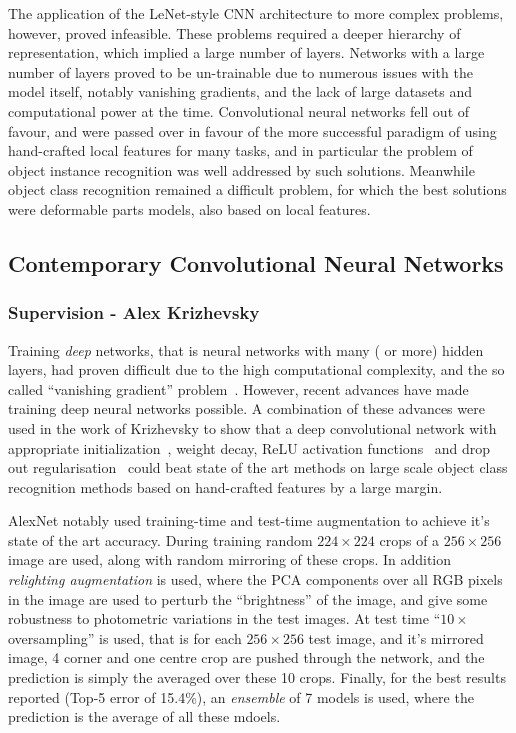 \documentclass[thesis]{subfiles}
\begin{document}
The application of the LeNet-style CNN architecture to more complex problems, however, proved infeasible. These problems required a deeper hierarchy of representation, which implied a large number of layers. Networks with a large number of layers proved to be un-trainable due to numerous issues with the model itself, notably vanishing gradients, and the lack of large datasets and computational power at the time. Convolutional neural networks fell out of favour, and were passed over in favour of the more successful paradigm of using hand-crafted local features for many tasks, and in particular the problem of object instance recognition was well addressed by such solutions. Meanwhile object class recognition remained a difficult problem, for which the best solutions were deformable parts models, also based on local features.

\subsection{Contemporary Convolutional Neural Networks}
\subsubsection{Supervision - Alex Krizhevsky \etal}
Training \emph{deep} networks, that is neural networks with many ( or more) hidden layers, had proven difficult due to the high computational complexity, and the so called ``vanishing gradient'' problem~\cite{bengio:ieeenn94}. However, recent advances have made training deep neural networks possible. A combination of these advances were used in the work of Krizhevsky \etal\cite{Krizhevsky2012imanet} to show that a deep convolutional network with appropriate initialization~\cite{Sutskever2013momentum}, weight decay, ReLU activation functions~\cite{conf/icml/NairH10} and drop out regularisation~\cite{1207.0580v1} could beat state of the art methods on large scale object class recognition methods based on hand-crafted features by a large margin. 

AlexNet notably used training-time and test-time augmentation to achieve it's state of the art accuracy. During training random $224 \times 224$ crops of a $256 \times 256$ image are used, along with random mirroring of these crops. In addition \emph{relighting augmentation} is used, where the PCA components over all RGB pixels in the image are used to perturb the ``brightness'' of the image, and give some robustness to photometric variations in the test images. At test time ``$10\times$ oversampling'' is used, that is for each $256\times 256$ test image, and it's mirrored image, 4 corner and one centre crop are pushed through the network, and the prediction is simply the averaged over these 10 crops. Finally, for the best results reported (Top-5 error of 15.4\%), an \emph{ensemble} of 7 models is used, where the prediction is the average of all these mdoels. 
\end{document}
